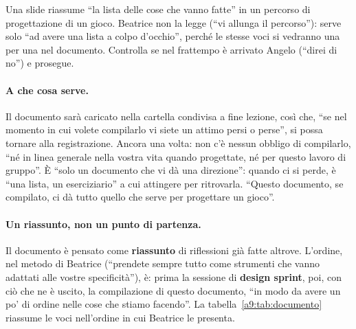 Una slide riassume ``la lista delle cose che vanno fatte'' in un percorso di
progettazione di un gioco. Beatrice non la legge (``vi allunga il percorso''):
serve solo ``ad avere una lista a colpo d'occhio'', perché le stesse voci si vedranno
una per una nel documento. Controlla se nel frattempo è arrivato Angelo (``direi di
no'') e prosegue.

\paragraph{A che cosa serve.} Il documento sarà caricato nella cartella condivisa a
fine lezione, così che, ``se nel momento in cui volete compilarlo vi siete un attimo
persi o perse'', si possa tornare alla registrazione. Ancora una volta: non c'è
nessun obbligo di compilarlo, ``né in linea generale nella vostra vita quando
progettate, né per questo lavoro di gruppo''. È ``solo un documento che vi dà una
direzione'': quando ci si perde, è ``una lista, un eserciziario'' a cui attingere per
ritrovarla. ``Questo documento, se compilato, ci dà tutto quello che serve per
progettare un gioco''.

\paragraph{Un riassunto, non un punto di partenza.} Il documento è pensato come
\textbf{riassunto} di riflessioni già fatte altrove. L'ordine, nel metodo di
Beatrice (``prendete sempre tutto come strumenti che vanno adattati alle vostre
specificità''), è: prima la sessione di \textbf{design sprint}, poi, con ciò che ne è
uscito, la compilazione di questo documento, ``in modo da avere un po' di ordine
nelle cose che stiamo facendo''. La tabella~\ref{a9:tab:documento} riassume le voci
nell'ordine in cui Beatrice le presenta.

